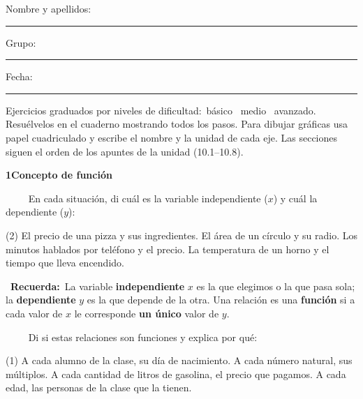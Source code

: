 \documentclass[11pt,a4paper]{article}
\newcommand{\estrelles}[1]{{\color{accent}\ifcase#1\or\faStar\faStar[regular]\faStar[regular]\or\faStar\faStar\faStar[regular]\or\faStar\faStar\faStar\fi}}
\newcounter{exer}
\newcommand{\ex}[1]{\par\needspace{4\baselineskip}\medskip\stepcounter{exer}\noindent{\color{navy}\bfseries\theexer.}\ \ {\small\estrelles{#1}}\ \ }
\newcommand{\seccio}[2]{\par\needspace{10\baselineskip}\bigskip
  \begin{tcolorbox}[colback=navy,colframe=navy,coltext=white,arc=2mm,boxrule=0pt,left=3mm,right=3mm,top=1.2mm,bottom=1.2mm]
  {\large\bfseries #1\quad #2}
  \end{tcolorbox}\vspace{-2pt}}
\newcommand{\recorda}[1]{\par\smallskip\begin{tcolorbox}[colback=accent!7,colframe=accent!55,arc=2mm,boxrule=0.5pt,left=2.5mm,right=2.5mm,top=1mm,bottom=1mm]\small{\color{accent}\faLightbulb[regular]}\ \textbf{Recuerda:}\ #1\end{tcolorbox}}
\begin{document}
\thispagestyle{primera}

\vspace{10pt}
Nombre y apellidos: \rule{6.6cm}{0.4pt}\hfill Grupo: \rule{1.6cm}{0.4pt}\hfill Fecha: \rule{2.2cm}{0.4pt}
\vspace{8pt}

\begin{tcolorbox}[colback=soft,colframe=soft,arc=2mm,left=3mm,right=3mm,top=1.5mm,bottom=1.5mm]
\small Ejercicios graduados por niveles de dificultad:\quad \estrelles{1}\ básico \qquad \estrelles{2}\ medio \qquad \estrelles{3}\ avanzado.\\[2pt] Resuélvelos en el cuaderno mostrando todos los pasos. Para dibujar gráficas usa papel cuadriculado y escribe el nombre y la unidad de cada eje. Las secciones siguen el orden de los apuntes de la unidad (10.1--10.8).
\end{tcolorbox}

\seccio{1}{Concepto de función}

\ex{1} En cada situación, di cuál es la variable independiente ($x$) y cuál la dependiente ($y$):\begin{tasks}(2)
  \task El precio de una pizza y sus ingredientes.
  \task El área de un círculo y su radio.
  \task Los minutos hablados por teléfono y el precio.
  \task La temperatura de un horno y el tiempo que lleva encendido.
\end{tasks}\recorda{La variable \textbf{independiente} $x$ es la que elegimos o la que pasa sola; la \textbf{dependiente} $y$ es la que depende de la otra. Una relación es una \textbf{función} si a cada valor de $x$ le corresponde \textbf{un único} valor de $y$.}

\ex{1} Di si estas relaciones son funciones y explica por qué:\begin{tasks}(1)
  \task A cada alumno de la clase, su día de nacimiento.
  \task A cada número natural, sus múltiplos.
  \task A cada cantidad de litros de gasolina, el precio que pagamos.
  \task A cada edad, las personas de la clase que la tienen.
\end{tasks}
\end{document}
